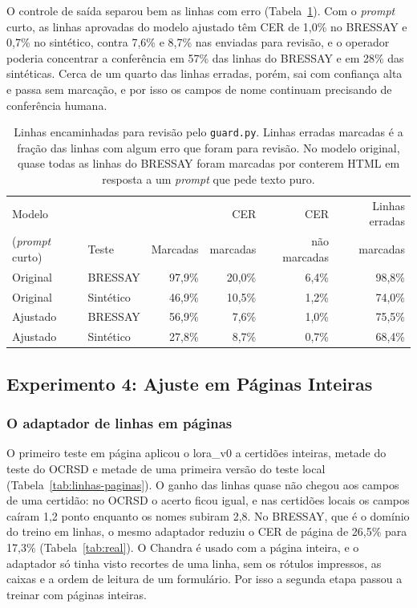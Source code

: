 \documentclass[12pt,a4paper]{article}
\begin{document}
O controle de saída separou bem as linhas com erro (Tabela~\ref{tab:guard}). Com o \emph{prompt} curto, as linhas aprovadas do modelo ajustado têm CER de 1,0\% no BRESSAY e 0,7\% no sintético, contra 7,6\% e 8,7\% nas enviadas para revisão, e o operador poderia concentrar a conferência em 57\% das linhas do BRESSAY e em 28\% das sintéticas. Cerca de um quarto das linhas erradas, porém, sai com confiança alta e passa sem marcação, e por isso os campos de nome continuam precisando de conferência humana.

\begin{table}[H]
\centering
\small
\begin{tabular}{@{}llrrrr@{}}
\toprule
Modelo & & & CER & CER & Linhas erradas \\
(\emph{prompt} curto) & Teste & Marcadas & marcadas & não marcadas & marcadas \\
\midrule
Original & BRESSAY & 97,9\% & 20,0\% & 6,4\% & 98,8\% \\
Original & Sintético & 46,9\% & 10,5\% & 1,2\% & 74,0\% \\
Ajustado & BRESSAY & 56,9\% & 7,6\% & 1,0\% & 75,5\% \\
Ajustado & Sintético & 27,8\% & 8,7\% & 0,7\% & 68,4\% \\
\bottomrule
\end{tabular}
\caption{Linhas encaminhadas para revisão pelo \texttt{guard.py}. Linhas erradas marcadas é a fração das linhas com algum erro que foram para revisão. No modelo original, quase todas as linhas do BRESSAY foram marcadas por conterem HTML em resposta a um \emph{prompt} que pede texto puro.}
\label{tab:guard}
\end{table}

\subsection{Experimento 4: Ajuste em Páginas Inteiras}
\label{subsec:exp4}

\subsubsection{O adaptador de linhas em páginas}
\label{subsec:linhas-paginas}
O primeiro teste em página aplicou o lora\_v0 a certidões inteiras, metade do teste do OCRSD e metade de uma primeira versão do teste local (Tabela~\ref{tab:linhas-paginas}). O ganho das linhas quase não chegou aos campos de uma certidão: no OCRSD o acerto ficou igual, e nas certidões locais os campos caíram 1,2 ponto enquanto os nomes subiram 2,8. No BRESSAY, que é o domínio do treino em linhas, o mesmo adaptador reduziu o CER de página de 26,5\% para 17,3\% (Tabela~\ref{tab:real}). O Chandra é usado com a página inteira, e o adaptador só tinha visto recortes de uma linha, sem os rótulos impressos, as caixas e a ordem de leitura de um formulário. Por isso a segunda etapa passou a treinar com páginas inteiras.
\end{document}
